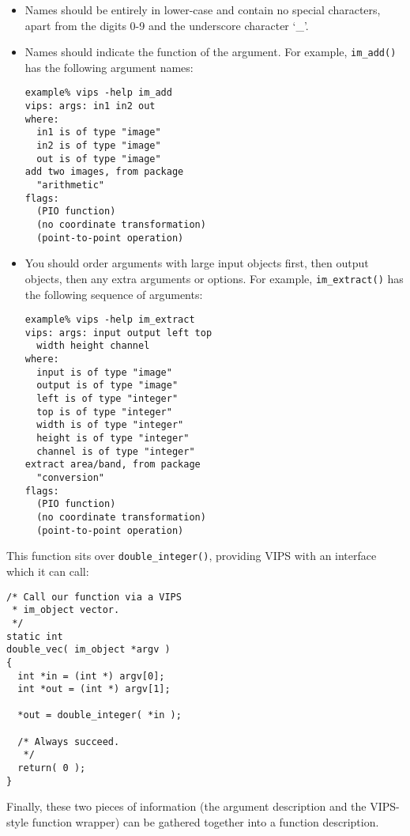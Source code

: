 \begin{itemize}

\item
Names should be entirely in lower-case and contain no special characters,
apart from the digits 0-9 and the underscore character  `\_'.

\item
Names should indicate the function of the argument. For example,
\verb+im_add()+ has the following argument names:

\begin{verbatim}
example% vips -help im_add
vips: args: in1 in2 out 
where:
  in1 is of type "image"
  in2 is of type "image"
  out is of type "image"
add two images, from package 
  "arithmetic"
flags: 
  (PIO function) 
  (no coordinate transformation) 
  (point-to-point operation) 
\end{verbatim}

\item
You should order arguments with large input objects first, then output
objects, then any extra arguments or options. For example, \verb+im_extract()+
has the following sequence of arguments:

\begin{verbatim}
example% vips -help im_extract
vips: args: input output left top 
  width height channel 
where:
  input is of type "image"
  output is of type "image"
  left is of type "integer"
  top is of type "integer"
  width is of type "integer"
  height is of type "integer"
  channel is of type "integer"
extract area/band, from package 
  "conversion"
flags: 
  (PIO function) 
  (no coordinate transformation) 
  (point-to-point operation) 
\end{verbatim}

\end{itemize}

This function sits over \verb+double_integer()+, providing VIPS with an
interface which it can call:

\begin{verbatim}
/* Call our function via a VIPS 
 * im_object vector.
 */
static int
double_vec( im_object *argv )
{
  int *in = (int *) argv[0];
  int *out = (int *) argv[1];

  *out = double_integer( *in );

  /* Always succeed.
   */
  return( 0 );
}
\end{verbatim}

Finally, these two pieces of information (the argument description and
the VIPS-style function wrapper) can be gathered together into a function
description.

